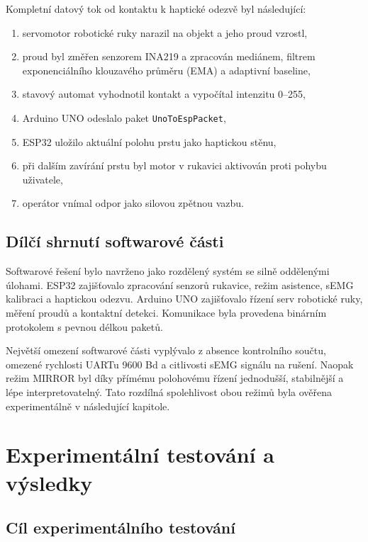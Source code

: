 \documentclass[FZS,DP]{tulthesis}
\begin{document}
Kompletní datový tok od kontaktu k haptické odezvě byl následující:

\begin{enumerate}
    \item servomotor robotické ruky narazil na objekt a jeho proud vzrostl,
    \item proud byl změřen senzorem INA219 a zpracován mediánem,  filtrem exponenciálního klouzavého průměru (EMA) a adaptivní baseline,
    \item stavový automat vyhodnotil kontakt a vypočítal intenzitu 0--255,
    \item Arduino UNO odeslalo paket \texttt{UnoToEspPacket},
    \item ESP32 uložilo aktuální polohu prstu jako haptickou stěnu,
    \item při dalším zavírání prstu byl motor v rukavici aktivován proti pohybu uživatele,
    \item operátor vnímal odpor jako silovou zpětnou vazbu.
\end{enumerate}

\section{Dílčí shrnutí softwarové části}
\label{sec:shrnuti-software}

Softwarové řešení bylo navrženo jako rozdělený systém se silně oddělenými úlohami. ESP32 zajišťovalo zpracování senzorů rukavice, režim asistence, sEMG kalibraci a haptickou odezvu. Arduino UNO zajišťovalo řízení serv robotické ruky, měření proudů a kontaktní detekci. Komunikace byla provedena binárním protokolem s pevnou délkou paketů.

Největší omezení softwarové části vyplývalo z absence kontrolního součtu, omezené rychlosti UARTu 9600 Bd a citlivosti sEMG signálu na rušení. Naopak režim MIRROR byl díky přímému polohovému řízení jednodušší, stabilnější a lépe interpretovatelný. Tato rozdílná spolehlivost obou režimů byla ověřena experimentálně v následující kapitole.

\chapter{Experimentální testování a výsledky}
\label{chap:experimentalni-testovani}

\section{Cíl experimentálního testování}
\label{sec:cil-testovani}
\end{document}
